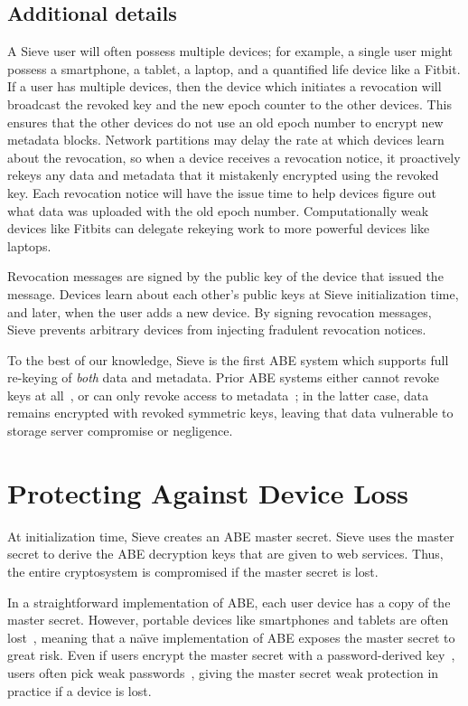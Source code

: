 \subsection{Additional details} A Sieve user
will often possess multiple devices; for example,
a single user might possess a smartphone, a tablet, a
laptop, and a quantified life device like a
Fitbit. If a user has multiple devices, then
the device which initiates a revocation will
broadcast the revoked key and the new epoch
counter to the other devices. This ensures
that the other devices do not use an old epoch
number to encrypt new metadata blocks. Network
partitions may delay the rate at which devices
learn about the revocation, so when a device
receives a revocation notice, it proactively
rekeys any data and metadata that it mistakenly
encrypted using the revoked key. Each revocation
notice will have the issue time to help devices
figure out what data was uploaded with the old
epoch number. Computationally
weak devices like Fitbits can delegate rekeying
work to more powerful devices like laptops.

Revocation messages are signed by the public
key of the device that issued the message.
Devices learn about each other's public keys
at Sieve initialization time, and later, when
the user adds a new device. By signing revocation
messages, Sieve prevents arbitrary devices
from injecting fradulent revocation notices.

To the best of our knowledge, Sieve is the
first ABE system which supports full re-keying
of \emph{both} data and metadata. Prior ABE systems either
cannot revoke keys at all~\cite{privio}, or can
only revoke access to metadata~\cite{persona,aauth,cachet};
in the latter case, data remains encrypted with
revoked symmetric keys, leaving that data vulnerable
to storage server compromise or negligence.


\section{Protecting Against Device Loss}
\label{sec:secretSharing}

At initialization time, Sieve creates an ABE
master secret. Sieve uses the master secret
to derive the ABE decryption keys that are
given to web services. Thus, the entire
cryptosystem is compromised if the master
secret is lost.

In a straightforward implementation of ABE, each
user device has a copy of the master secret.
However, portable devices like smartphones and
tablets are often lost~\cite{wang2012smartphone},
meaning that a na\"{\i}ve implementation of ABE
exposes the master secret to great risk. Even if
users encrypt the master secret with a
password-derived key~\cite{pbkdf}, users often
pick weak passwords~\cite{gaw2006password},
giving the master secret weak protection in
practice if a device is lost.

